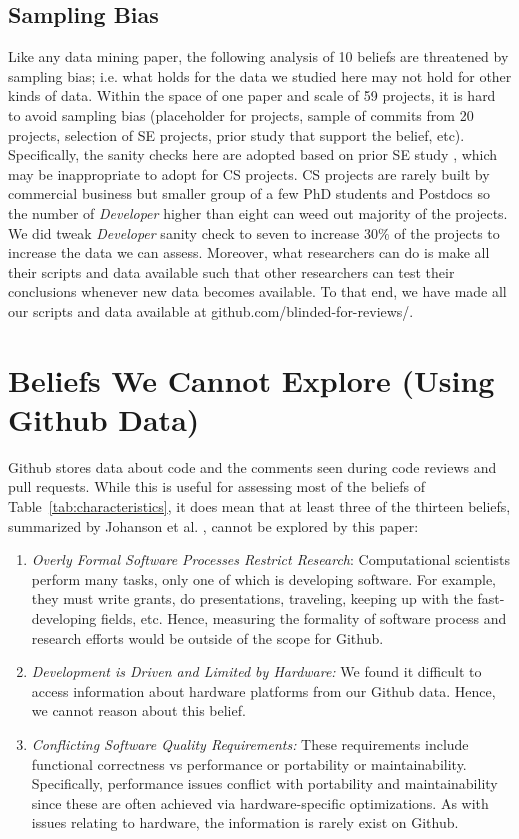 \documentclass[sigconf,review,anonymous]{acmart}
\newcommand{\be}{\begin{enumerate}}
\newcommand{\ee}{\end{enumerate}}
\begin{document}
\subsection{Sampling Bias}

Like any data mining paper,
the following analysis of 10 beliefs are threatened by sampling bias; i.e.  what holds for the data we studied here may
not hold for other kinds of data. 
Within the space of one paper and scale of 59 projects, it is hard to avoid sampling bias (placeholder for projects, sample of commits from 20 projects, selection of SE projects, prior study that support the belief, etc). Specifically, the sanity checks here are adopted based on prior SE study \cite{agrawal2018we}, which may be inappropriate to adopt for CS projects. CS projects are rarely built by commercial business but smaller group of a few PhD students and Postdocs so the number of \textit{Developer} higher than eight can weed out majority of the projects. We did tweak \textit{Developer} sanity check to seven to increase 30\% of the projects to increase the data we can assess.
Moreover, what researchers can do is make all their scripts and data available
such that other researchers can test their conclusions whenever new data becomes available. To that end, we have made all our scripts and data available at github.com/blinded-for-reviews/.


\section{Beliefs We Cannot Explore (Using Github Data)}

Github stores data about code and the comments seen during code reviews and pull requests. While
this is useful for assessing most of the beliefs of Table~\ref{tab:characteristics}, it does mean that at least 
three of the thirteen beliefs, summarized by Johanson et al. \cite{johan18_secs}, cannot be explored by this paper:

\be
\item {\em Overly Formal Software Processes Restrict Research}: Computational scientists perform many tasks,
only one of which is developing software. For example,
they must write  grants, do presentations, traveling, keeping up with the fast-developing fields, etc. Hence, measuring the formality of software process and research efforts would be outside of the scope for Github.
\item {\em Development is Driven and Limited by Hardware:}
We found it  difficult to access information about hardware platforms from our Github data. Hence, we cannot reason about this belief.
\item {\em Conflicting Software Quality Requirements:} These requirements include functional correctness vs
performance or  portability or maintainability. Specifically, performance issues conflict with portability and maintainability since these are often  achieved via
 hardware-specific optimizations. As with issues
relating to hardware,
the information is rarely exist on Github. 
\ee
\end{document}
